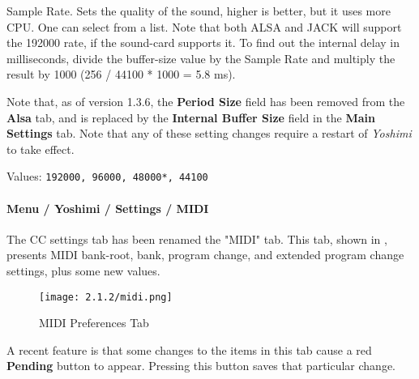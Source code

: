    Sample Rate.
   Sets the quality of the sound, higher is better, but it uses more CPU.  One
   can select from a list.  Note that both ALSA and JACK will support the
   192000 rate, if the sound-card supports it.  To find out the internal delay
   in milliseconds, divide the buffer-size value by the Sample Rate and
   multiply the result by 1000 (256 / 44100 * 1000 = 5.8 ms).

   Note that, as of version 1.3.6, the \textbf{Period Size} field has been
   removed from the \textbf{Alsa} tab, and is replaced by the
   \textbf{Internal Buffer Size} field in the \textbf{Main Settings} tab.
   Note that any of these setting changes require a restart of \textsl{Yoshimi}
   to take effect.


   Values: \texttt{192000, 96000, 48000*, 44100}

\paragraph{Menu / Yoshimi / Settings / MIDI}
\label{paragraph:menu_yoshimi_settings_ccs}

   The CC settings tab has been renamed the "MIDI" tab.
   This tab, shown in
   ,
   presents MIDI bank-root, bank, program change, and extended program
   change settings, plus some new values.

\begin{figure}[H]
   \centering
   \texttt{[image: 2.1.2/midi.png]}
   \caption[MIDI Preferences]{MIDI Preferences Tab}
   \label{fig:yoshimi_settings_cc}
\end{figure}

   A recent feature is that some changes to the items in this
   tab cause a red \textbf{Pending} button to appear.  Pressing this
   button saves that particular change.


